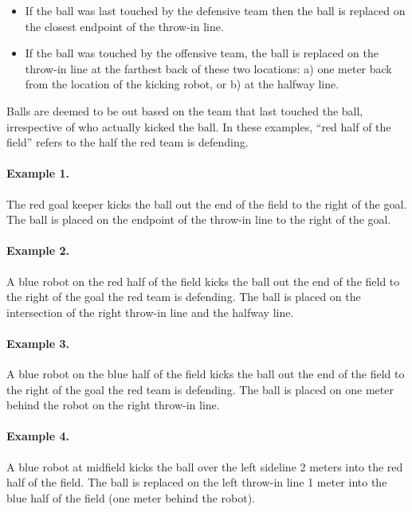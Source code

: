 \documentclass[12pt]{article}
\begin{document}
\begin{itemize}

\item If the ball was last touched by the defensive team then the ball is replaced on the closest endpoint of the throw-in line.

\item If the ball was touched by the offensive team, the ball is replaced on
the throw-in line at the farthest back of these two locations: a) one
meter back from the location of the kicking robot, or b) at the halfway
line.

\end{itemize}

Balls are deemed to be out based on the team that last touched the ball, irrespective of who actually kicked the ball.  In these examples, ``red half of the field'' refers to the half the red team is defending.

\paragraph{Example 1.} The red goal keeper kicks the ball out the end of the field to the right of the goal. The ball is placed on the endpoint of the throw-in line to the right of the goal.

\paragraph{Example 2.} A blue robot on the red half of the field kicks the ball out the end of the field to the right of the goal the red team is defending. The ball is placed on the intersection of the right throw-in line and the halfway line.

\paragraph{Example 3.} A blue robot on the blue half of the field kicks the ball out the end of the field to the right of the goal the red team is defending. The ball is placed on one meter behind the robot on the right throw-in line.

\paragraph{Example 4.} A blue robot at midfield kicks the ball over the left sideline 2 meters into the red half of the field. The ball is replaced on the left throw-in line 1 meter into the blue half of the field (one meter behind the robot).
\end{document}
